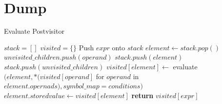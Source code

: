 \documentclass{article}
\begin{document}



\section{Dump}

\begin{algorithm}
\caption{Evaluate Postvisitor}\label{evalpostvisitor}
\begin{algorithmic}[1]
\State $stack = []$
\State $visited = \{\}$
\State Push $expr$ onto $stack$
\State $element \gets stack.pop()$
\State $unvisited\_children.push(operand)$
\EndIf
\EndFor
{}
\State $stack.push(element)$
\State $stack.push(unvisited\_children)$
\Else
\State $visited[element] \gets$ evaluate$(element, *(visited[operand]$ for $operand$ in $element.opernads), symbol\_map = conditions)$
\State $element.storedvalue \gets visited[element]$
\EndIf
\EndWhile\label{euclidendwhile}
\State \textbf{return} $visited[expr]$
\EndProcedure
\end{algorithmic}
\end{algorithm}
\end{document}
